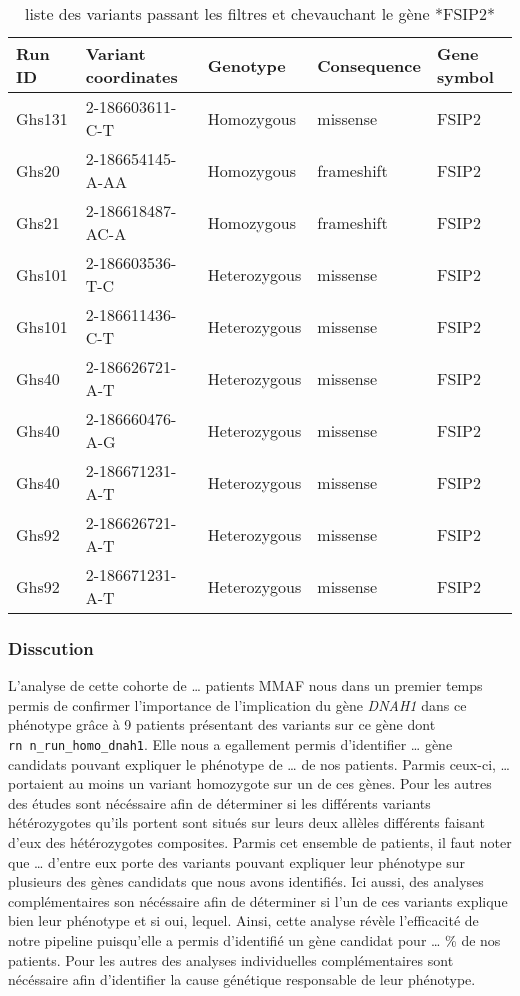 \documentclass[12pt,twoside]{reedthesis}
\theoremstyle{definition}
\theoremstyle{definition}
\theoremstyle{remark}
\begin{document}
  \begin{longtable}[t]{lllll}
  \caption{\label{tab:tabfsip2}liste des variants passant les filtres et chevauchant le gène *FSIP2*}\\
  \toprule
  Run ID & Variant coordinates & Genotype & Consequence & Gene symbol\\
  \midrule
  Ghs131 & 2-186603611-C-T & Homozygous & missense & FSIP2\\
  Ghs20 & 2-186654145-A-AA & Homozygous & frameshift & FSIP2\\
  Ghs21 & 2-186618487-AC-A & Homozygous & frameshift & FSIP2\\
  Ghs101 & 2-186603536-T-C & Heterozygous & missense & FSIP2\\
  Ghs101 & 2-186611436-C-T & Heterozygous & missense & FSIP2\\
  \addlinespace
  Ghs40 & 2-186626721-A-T & Heterozygous & missense & FSIP2\\
  Ghs40 & 2-186660476-A-G & Heterozygous & missense & FSIP2\\
  Ghs40 & 2-186671231-A-T & Heterozygous & missense & FSIP2\\
  Ghs92 & 2-186626721-A-T & Heterozygous & missense & FSIP2\\
  Ghs92 & 2-186671231-A-T & Heterozygous & missense & FSIP2\\
  \bottomrule
  \end{longtable}
  
  \newpage
  
  \subsubsection{Disscution}\label{disscution}
  
  L'analyse de cette cohorte de \ldots{} patients MMAF nous dans un
  premier temps permis de confirmer l'importance de l'implication du gène
  \emph{DNAH1} dans ce phénotype grâce à 9 patients présentant des
  variants sur ce gène dont \texttt{rn\ n\_run\_homo\_dnah1}. Elle nous a
  egallement permis d'identifier \ldots{} gène candidats pouvant expliquer
  le phénotype de \ldots{} de nos patients. Parmis ceux-ci, \ldots{}
  portaient au moins un variant homozygote sur un de ces gènes. Pour les
  autres des études sont nécéssaire afin de déterminer si les différents
  variants hétérozygotes qu'ils portent sont situés sur leurs deux allèles
  différents faisant d'eux des hétérozygotes composites. Parmis cet
  ensemble de patients, il faut noter que \ldots{} d'entre eux porte des
  variants pouvant expliquer leur phénotype sur plusieurs des gènes
  candidats que nous avons identifiés. Ici aussi, des analyses
  complémentaires son nécéssaire afin de déterminer si l'un de ces
  variants explique bien leur phénotype et si oui, lequel. Ainsi, cette
  analyse révèle l'efficacité de notre pipeline puisqu'elle a permis
  d'identifié un gène candidat pour \ldots{} \% de nos patients. Pour les
  autres des analyses individuelles complémentaires sont nécéssaire afin
  d'identifier la cause génétique responsable de leur phénotype.
  
\end{document}
